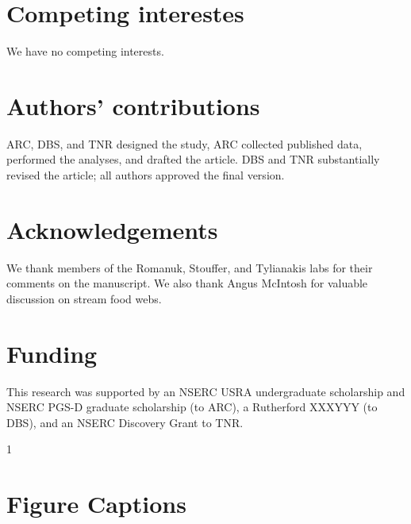 \documentclass[12pt]{article}
\begin{document}
\section*{Competing interestes}
  
  We have no competing interests.

\section*{Authors' contributions}
  
  ARC, DBS, and TNR designed the study, ARC collected
  published data, performed the analyses, and drafted the 
  article. DBS and TNR substantially revised the article;
  all authors approved the final version.


\section*{Acknowledgements}
  
  We thank members of the Romanuk, Stouffer, and Tylianakis labs for their comments on
  the manuscript. We also thank Angus McIntosh for valuable discussion on stream food webs.

\section*{Funding}
  This research was supported by an NSERC USRA undergraduate scholarship and NSERC PGS-D 
  graduate scholarship (to ARC), a Rutherford XXXYYY (to DBS), and an NSERC Discovery Grant to TNR.

1
\newpage

\newpage

\section*{Figure Captions}
\end{document}

